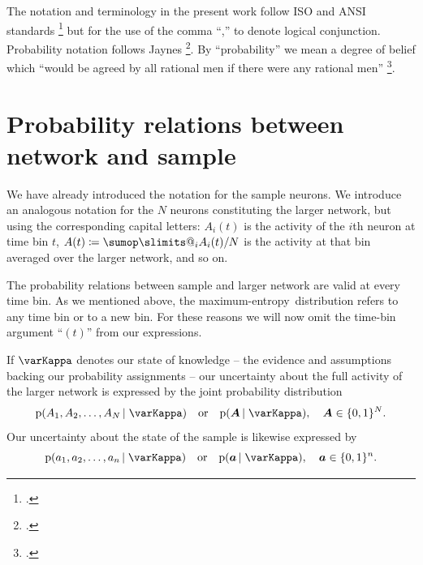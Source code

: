 \documentclass[\ifafour a4paper,12pt,\else a5paper,10pt,\fi%
onecolumn,oneside,article,%
british%
]{memoir}
\makeatletter
\theoremstyle{remark}
\theoremstyle{innote}
\def\sum{\DOTSI\sumop\slimits@}
\newcommand*{\citep}{\footcites}
\newcommand*{\defd}{\coloneqq}
\DeclarePairedDelimiter\set{\{}{\}}
\newcommand*{\pf}{\mathrm{p}}%
\renewcommand*{\|}[1][]{\nonscript\,#1\vert\nonscript\;\mathopen{}}
\newcommand*{\yAv}{A}
\newcommand*{\yav}{a}
\newcommand*{\yNv}{N}
\newcommand*{\yaa}{\bm{\yav}}%
\newcommand*{\yAA}{\bm{\yAv}}%
\newcommand*{\yA}{\yAv}%
\newcommand*{\yHc}{\varKappa}
\newcommand*{\me}{maximum-entropy}
\makeatother
\begin{document}
The notation and terminology in the present work follow ISO and ANSI standards
\citep{iso1993,ieee1993,nist1995,iso2006,iso2006b} but for the use of the
comma \enquote{,} to denote logical conjunction. Probability notation
follows Jaynes \citep{jaynes1994_r2003}. By \enquote{probability} we mean a
degree of belief which \enquote{would be agreed by all rational men if
  there were any rational men} \citep{good1966}.



\section{Probability relations between network and  sample}
\label{sec:prob_samples}

We have already introduced the notation for the sample neurons. We
introduce an analogous notation for the $\yNv$ neurons constituting the
larger network, but using the corresponding capital letters:
$\yAv_{i}(t)$ is the activity of the $i$th neuron at time bin $t$,
$\yA(t) \defd \sum_{i} \yAv_{i}(t)/\yNv$ is the activity at that
bin averaged over the larger network, and so on.

The probability relations between sample and larger network are valid at
every time bin. As we mentioned above, the \me\ distribution refers to any
time bin or to a new bin. For these reasons we will now omit the time-bin
argument \enquote{$(t)$} from our expressions. 



If $\yHc$ denotes our state of knowledge -- the evidence and assumptions
backing our probability assignments -- our uncertainty about the full
activity of the larger network is expressed by the joint probability
distribution
\begin{equation}
  \label{eq:joint_plaus}
  \pf(\yAv_1, \yAv_2, \dotsc, \yAv_\yNv \| \yHc)
  \quad\text{or}\quad
\pf(\yAA \| \yHc), \quad \yAA \in \set{0,1}^\yNv.
\end{equation}
Our uncertainty about the state of the sample is likewise expressed by
\begin{equation}
  \label{eq:sample_plaus}
  \pf(\yav_1, \yav_2, \dotsc, \yav_n \| \yHc) \quad\text{or}\quad
\pf(\yaa \| \yHc), \quad \yaa \in \set{0,1}^n.
\end{equation}
\end{document}
